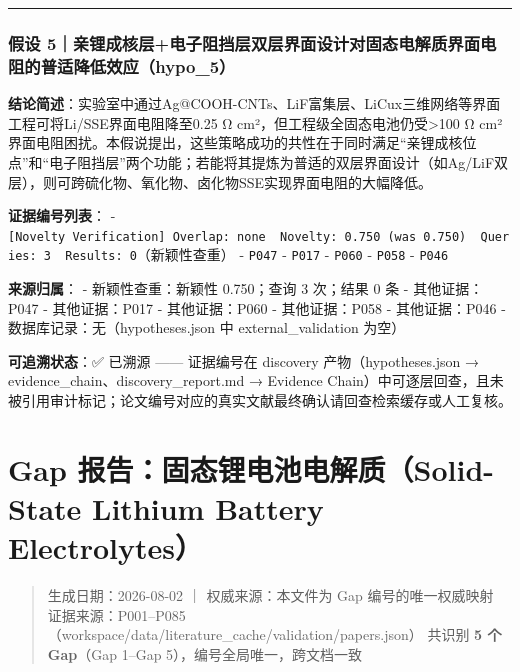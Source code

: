 \documentclass[12pt,a4paper]{ctexart}
\begin{document}
\begin{center}\rule{0.5\linewidth}{0.5pt}\end{center}

\subsubsection{假设 5｜亲锂成核层+电子阻挡层双层界面设计对固态电解质界面电阻的普适降低效应（hypo\_5）}\label{ux5047ux8bbe-5ux4eb2ux9502ux6210ux6838ux5c42ux7535ux5b50ux963bux6321ux5c42ux53ccux5c42ux754cux9762ux8bbeux8ba1ux5bf9ux56faux6001ux7535ux89e3ux8d28ux754cux9762ux7535ux963bux7684ux666eux9002ux964dux4f4eux6548ux5e94hypo_5}

\textbf{结论简述}：实验室中通过Ag@COOH-CNTs、LiF富集层、LiCux三维网络等界面工程可将Li/SSE界面电阻降至0.25 Ω cm²，但工程级全固态电池仍受\textgreater100 Ω cm²界面电阻困扰。本假说提出，这些策略成功的共性在于同时满足``亲锂成核位点''和``电子阻挡层''两个功能；若能将其提炼为普适的双层界面设计（如Ag/LiF双层），则可跨硫化物、氧化物、卤化物SSE实现界面电阻的大幅降低。

\textbf{证据编号列表}： - \texttt{{[}Novelty\ Verification{]}\ Overlap:\ none\ \textbar{}\ Novelty:\ 0.750\ (was\ 0.750)\ \textbar{}\ Queries:\ 3\ \textbar{}\ Results:\ 0}（新颖性查重） - \texttt{P047} - \texttt{P017} - \texttt{P060} - \texttt{P058} - \texttt{P046}

\textbf{来源归属}： - 新颖性查重：新颖性 0.750；查询 3 次；结果 0 条 - 其他证据：P047 - 其他证据：P017 - 其他证据：P060 - 其他证据：P058 - 其他证据：P046 - 数据库记录：无（hypotheses.json 中 external\_validation 为空）

\textbf{可追溯状态}：✅ 已溯源 ------ 证据编号在 discovery 产物（hypotheses.json → evidence\_chain、discovery\_report.md → Evidence Chain）中可逐层回查，且未被引用审计标记；论文编号对应的真实文献最终确认请回查检索缓存或人工复核。

\section{Gap 报告：固态锂电池电解质（Solid-State Lithium Battery Electrolytes）}\label{gap:gap-ux62a5ux544aux56faux6001ux9502ux7535ux6c60ux7535ux89e3ux8d28solid-state-lithium-battery-electrolytes}

\begin{quote}
生成日期：2026-08-02 ｜ 权威来源：本文件为 Gap 编号的唯一权威映射 证据来源：P001--P085（workspace/data/literature\_cache/validation/papers.json） 共识别 \textbf{5 个 Gap}（Gap 1--Gap 5），编号全局唯一，跨文档一致
\end{quote}
\end{document}
